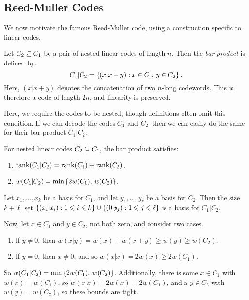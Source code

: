 \documentclass{article}
\begin{document}

\subsection{Reed-Muller Codes}
\label{section-algebraic-reed-muller-code}

We now motivate the famous Reed-Muller code, using  a construction specific to linear codes.

\begin{definition}
	\label{bar-product-definition}
    Let $C_2 \subseteq C_1$ be a pair of nested linear codes of length $n$. Then the \textit{bar product} is defined by:
    \[
	C_1|C_2 = \left\lbrace (x|x+y) : x \in C_1, \, y \in C_2 \right\rbrace.
	\]
	Here, $(x|x+y)$ denotes the concatenation of two $n$-long codewords. This is therefore a code of length $2n$, and linearity is preserved.
\end{definition}

\begin{note}
	Here, we require the codes to be nested, though definitions often omit this condition. If we can decode the codes $C_1$ and $C_2$, then we can easily do the same for their bar product $C_1|C_2$.
\end{note}

\begin{proposition}
	\label{bar-product-properties}
    For nested linear codes $C_2 \subseteq C_1$, the bar product satisfies:
    \begin{enumerate}
	    \item $\operatorname{rank}(C_1|C_2) = \operatorname{rank}(C_1) + \operatorname{rank}(C_2)$.
	    \item $w(C_1|C_2) = \min \left\lbrace 2w(C_1), \, w(C_2) \right\rbrace$.
	\end{enumerate}
\end{proposition}

\begin{prf}
    Let $x_1, \dots, x_k$ be a basis for $C_1$, and 
    let $y_1, \dots, y_\ell$ be a basis for $C_2$.
    Then the size $k+\ell$ set
    $\left\lbrace (x_i|x_i) : 1 \leqslant i \leqslant k \right\rbrace \cup \left\lbrace (0|y_j) : 1 \leqslant j \leqslant \ell \right\rbrace$
	is a basis for $C_1|C_2$.
	
	Now, let $x \in C_1$ and $y \in C_2$, not both zero, and consider two cases.
	\begin{enumerate}
    	\item If $y \neq 0$, then $w(x|y) = w(x) + w(x+y) \geq w(y) \geq w(C_2)$.
    	\item If $y = 0$, then $x \neq 0$, and so $w(x|x) = 2w(x) \geq 2w(C_1)$.
	\end{enumerate}
	So $w(C_1|C_2) = \min \left\lbrace 2w(C_1), \, w(C_2) \right\rbrace$. Additionally, there is some $x \in C_1$ with $w(x) = w(C_1)$, so $w(x|x) = 2w(x) = 2w(C_1)$, and a $y \in C_2$ with $w(y) = w(C_2)$, so these bounds are tight.
\end{prf}
\end{document}
